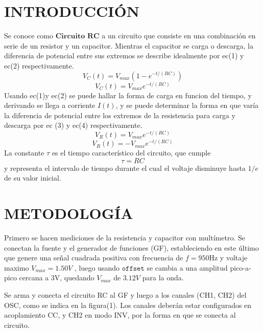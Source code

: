 \documentclass[10pt,twocolumn]{article}
\begin{document}
\section{INTRODUCCIÓN}
Se conoce como $\textbf{Circuito RC}$ a un circuito que consiste en una combinación en 
serie de un resistor y un capacitor. Mientras el capacitor se carga o descarga, la diferencia de potencial entre sus extremos se describe idealmente
por ec(1) y ec(2) respectivamente.
\begin{equation}V_C(t)=V_{max} \left(1 - e^{-t/(RC)}\right)\end{equation}
\begin{equation}V_C(t)=V_{max} e^{-t/(RC)}\end{equation}
Usando ec(1)y ec(2) se puede hallar la forma de carga en funcion del tiempo, y derivando se llega a corriente $I(t)$, y se puede 
determinar la forma en que varía la diferencia de potencial entre los extremos de la resistencia para carga y descarga por ec (3) 
y ec(4) respectivamente.
\begin{equation}V_R(t)=V_{max} e^{-t/(RC)}\end{equation} 
\begin{equation}V_R(t)=-V_{max} e^{-t/(RC)}\end{equation} 
La constante $\tau$ es el tiempo característico del circuito, que cumple \begin{equation}\tau=RC\end{equation} 
y representa el intervalo de tiempo durante el cual el voltaje disminuye hasta $1/e$ de su valor inicial.
\section{METODOLOGÍA}
Primero se hacen mediciones de la resistencia y capacitor con multímetro.
Se conectan la fuente y el generador de funciones (GF), estableciendo en este último que genere una señal cuadrada positiva 
con frecuencia de $f=950$Hz y voltaje maximo $V_{max}=1.50V$ , luego usando $\texttt{offset}$ se cambia a una amplitud pico-a-pico cercana a 3V, quedando
$V_{max}$ de $3.12V$ para la onda.

Se arma y conecta el circuito RC al GF y luego a los canales (CH1, CH2) del OSC, como se indica en la figura(1). Los canales 
deberán estar configurados en acoplamiento CC, y CH2 en modo INV, por la forma en que se conecta al circuito.
\end{document}
